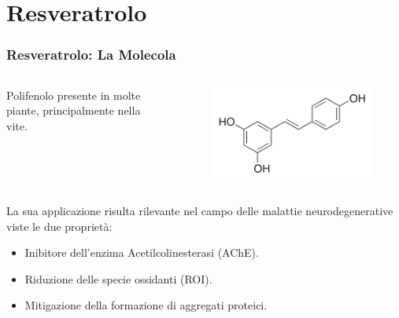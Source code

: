\documentclass[9pt]{beamer}
\begin{document}
\section{Resveratrolo}

\begin{frame}
	\frametitle{Resveratrolo: La Molecola}
	\begin{columns}
		\begin{column}{0.5\textwidth}
			Polifenolo presente in molte piante, principalmente nella vite.
		\end{column}
		\begin{column}{0.5\textwidth}
			\begin{figure}
				\includegraphics[width=.8\textwidth]{immagini/resveratrolo.png}
			\end{figure}
		\end{column}
	\end{columns}
	\medskip
	La sua applicazione risulta rilevante nel campo delle malattie neurodegenerative viste le due proprietà:
	\begin{itemize}
		\item Inibitore dell'enzima Acetilcolinesterasi (AChE).
		\item Riduzione delle specie ossidanti (ROI).
		\item Mitigazione della formazione di aggregati proteici.
	\end{itemize}
\end{frame}
\end{document}
